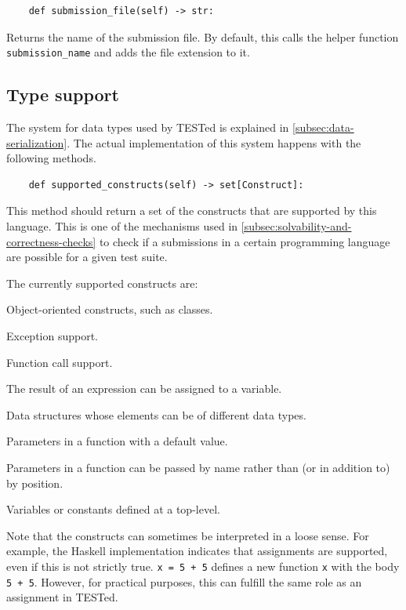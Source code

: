 \documentclass[../main]{subfiles}
\begin{document}
\begin{verbatim}
    def submission_file(self) -> str:
\end{verbatim}

Returns the name of the submission file.
By default, this calls the helper function \texttt{submission_name} and adds the file extension to it.

\subsection{Type support}\label{subsec:type-support}

The system for data types used by TESTed is explained in \cref{subsec:data-serialization}.
The actual implementation of this system happens with the following methods.

\begin{verbatim}
    def supported_constructs(self) -> set[Construct]:
\end{verbatim}

This method should return a set of the constructs that are supported by this language.
This is one of the mechanisms used in \cref{subsec:solvability-and-correctness-checks} to check if a submissions in a certain programming language are possible for a given test suite.

The currently supported constructs are:

\begin{description}[noitemsep]
    \item[Objects] Object-oriented constructs, such as classes.
    \item[Exceptions] Exception support.
    \item[Function calls] Function call support.
    \item[Assignments] The result of an expression can be assigned to a variable.
    \item[Heterogeneous collections] Data structures whose elements can be of different data types.
    \item[Default parameters] Parameters in a function with a default value.
    \item[Named parameters] Parameters in a function can be passed by name rather than (or in addition to) by position.
    \item[Global variables] Variables or constants defined at a top-level.
\end{description}

Note that the constructs can sometimes be interpreted in a loose sense.
For example, the Haskell implementation indicates that assignments are supported, even if this is not strictly true.
\texttt{x = 5 + 5} defines a new function \texttt{x} with the body \texttt{5 + 5}.
However, for practical purposes, this can fulfill the same role as an assignment in TESTed.
\end{document}
